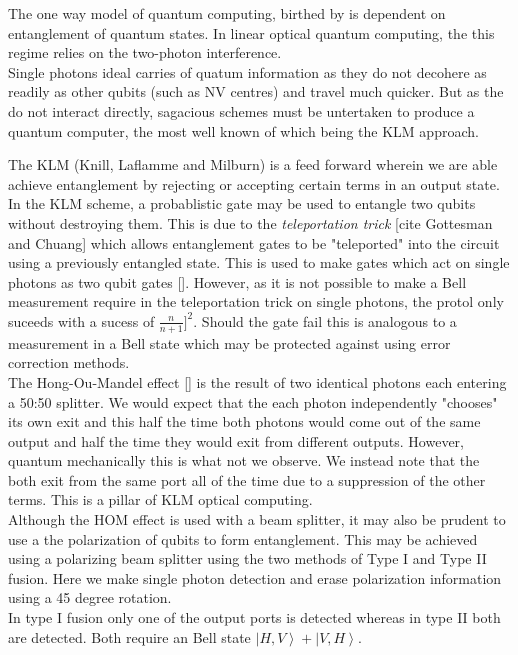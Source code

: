\documentclass{article}
\numberwithin{equation}{section} %
\newcommand{\ket}[1]{\left| #1 \right>} %
\begin{document}
  The one way model of quantum computing, birthed by \cite{one} is dependent on entanglement of quantum states. In linear optical quantum computing, the this regime relies on the two-photon interference. \\
  
Single photons ideal carries of quatum information as they do not decohere as readily as other qubits (such as NV centres) and travel much quicker. But as the do not interact directly, sagacious schemes must be untertaken to produce a quantum computer, the most well known of which being the KLM approach.  

The KLM (Knill, Laflamme and Milburn) is a feed forward wherein we are able achieve entanglement by rejecting or accepting certain terms in an output state. In the KLM scheme, a probablistic gate may be used to entangle two qubits without destroying them. This is due to the \emph{teleportation trick} [cite Gottesman and Chuang] which allows entanglement gates to be "teleported" into the circuit using a previously entangled state. This is used to make gates which act on single photons as two qubit gates []. However, as it is not possible to make a Bell measurement require in the teleportation trick on single photons, the protol only suceeds with a sucess of $\frac{n}{n+1}]^2$. Should the gate fail this is analogous to a measurement in a Bell state which may be protected against using error correction methods. \\

 The Hong-Ou-Mandel effect [] is the result of two identical photons each entering a 50:50 splitter. We would expect that the each photon independently "chooses" its own exit and this half the time both photons would come out of the same output and half the time they would exit from different outputs. However, quantum mechanically this is what not we observe. We instead note that the both exit from the same port all of the time due to a suppression of the other terms. This is a pillar of KLM optical computing. \\
 
 Although the HOM effect is used with a beam splitter, it may also be prudent to use a the polarization of qubits to form entanglement. This may be achieved using a polarizing beam splitter using the two methods of Type I and Type II fusion. Here we make single photon detection and erase polarization information using a 45 degree rotation. \\
 
 
 In type I fusion only one of the output ports is detected whereas in type II both are detected. Both require an Bell state $\ket{H,V} + \ket{V,H}$. \\
 
\end{document}
